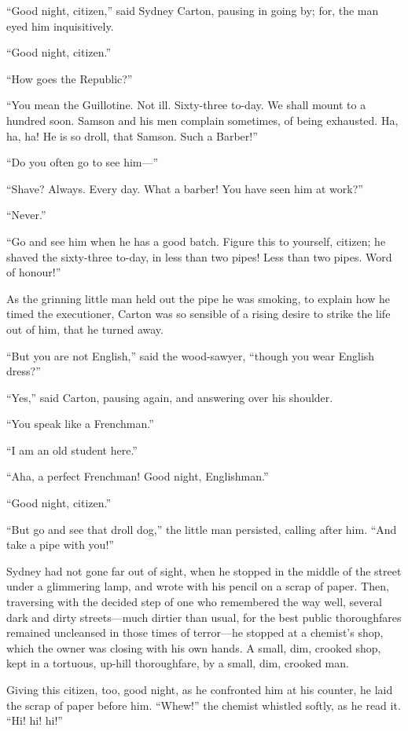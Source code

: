``Good night, citizen,'' said Sydney Carton, pausing in going by;
for, the man eyed him inquisitively.

``Good night, citizen.''

``How goes the Republic?''

``You mean the Guillotine.  Not ill.  Sixty-three to-day.  We shall
mount to a hundred soon.  Samson and his men complain sometimes, of
being exhausted.  Ha, ha, ha!  He is so droll, that Samson.
Such a Barber!''

``Do you often go to see him---''

``Shave?  Always.  Every day.  What a barber!  You have seen him at work?''

``Never.''

``Go and see him when he has a good batch.  Figure this to yourself,
citizen; he shaved the sixty-three to-day, in less than two pipes!
Less than two pipes.  Word of honour!''

As the grinning little man held out the pipe he was smoking, to
explain how he timed the executioner, Carton was so sensible of a
rising desire to strike the life out of him, that he turned away.

``But you are not English,'' said the wood-sawyer, ``though you wear
English dress?''

``Yes,'' said Carton, pausing again, and answering over his shoulder.

``You speak like a Frenchman.''

``I am an old student here.''

``Aha, a perfect Frenchman!  Good night, Englishman.''

``Good night, citizen.''

``But go and see that droll dog,'' the little man persisted, calling
after him.  ``And take a pipe with you!''

Sydney had not gone far out of sight, when he stopped in the middle
of the street under a glimmering lamp, and wrote with his pencil on a
scrap of paper.  Then, traversing with the decided step of one who
remembered the way well, several dark and dirty streets---much dirtier
than usual, for the best public thoroughfares remained uncleansed in
those times of terror---he stopped at a chemist's shop, which the
owner was closing with his own hands.  A small, dim, crooked shop,
kept in a tortuous, up-hill thoroughfare, by a small, dim, crooked man.

Giving this citizen, too, good night, as he confronted him at his
counter, he laid the scrap of paper before him.  ``Whew!'' the chemist
whistled softly, as he read it.  ``Hi! hi! hi!''

